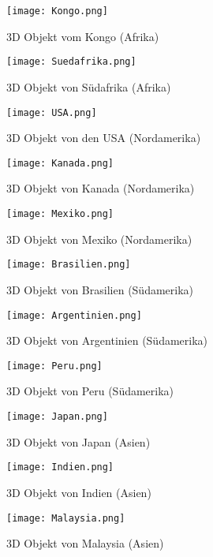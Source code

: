 \begin{figure}[!htb]
  \texttt{[image: Kongo.png]}
  \caption{3D Objekt vom Kongo (Afrika)}\label{fig:kongo}
\endminipage\hfill
{}
  \texttt{[image: Suedafrika.png]}
  \caption{3D Objekt von Südafrika (Afrika)}\label{fig:suedafrika}
\endminipage\hfill
\end{figure}

\begin{figure}[!htb]
  \texttt{[image: USA.png]}
  \caption{3D Objekt von den USA (Nordamerika)}\label{fig:usa}
\endminipage\hfill
{}
  \texttt{[image: Kanada.png]}
  \caption{3D Objekt von Kanada (Nordamerika)}\label{fig:kanada}
\endminipage\hfill
\end{figure}

\begin{figure}[!htb]
  \texttt{[image: Mexiko.png]}
  \caption{3D Objekt von Mexiko (Nordamerika)}\label{fig:mexiko}
\endminipage\hfill
{}
  \texttt{[image: Brasilien.png]}
  \caption{3D Objekt von Brasilien (Südamerika)}\label{fig:brasilien}
\endminipage\hfill
\end{figure}

\begin{figure}[!htb]
  \texttt{[image: Argentinien.png]}
  \caption{3D Objekt von Argentinien (Südamerika)}\label{fig:argentinien}
\endminipage\hfill
{}
  \texttt{[image: Peru.png]}
  \caption{3D Objekt von Peru (Südamerika)}\label{fig:peru}
\endminipage\hfill
\end{figure}

\begin{figure}[!htb]
  \texttt{[image: Japan.png]}
  \caption{3D Objekt von Japan (Asien)}\label{fig:japan}
\endminipage\hfill
{}
  \texttt{[image: Indien.png]}
  \caption{3D Objekt von Indien (Asien)}\label{fig:indien}
\endminipage\hfill
\end{figure}

\begin{figure}[!htb]
  \texttt{[image: Malaysia.png]}
  \caption{3D Objekt von Malaysia (Asien)}\label{fig:malaysia}
\endminipage\hfill
\end{figure}


